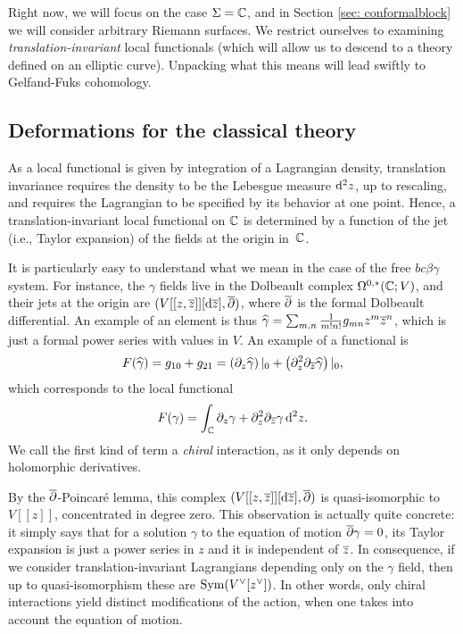 Right now, we will focus on the case $\Sigma = \mathbb C$, 
and in Section \ref{sec: conformalblock} we will consider arbitrary Riemann surfaces.
We restrict ourselves to examining {\em translation-invariant} local functionals (which will allow us to descend to a theory defined on an elliptic curve).
Unpacking what this means will lead swiftly to Gelfand-Fuks cohomology.

\subsection{Deformations for the classical theory}

As a local functional is given by integration of a Lagrangian density,
translation invariance requires the density to be the Lebesgue measure ${\rm d}^2 z$, up to rescaling,  
and requires the Lagrangian to be specified by its behavior at one point.
Hence, a translation-invariant local functional on $\mathbb C$ is determined by a function of the jet (i.e., Taylor expansion) of the fields at the origin in~$\mathbb C$. 

It is particularly easy to understand what we mean in the case of the free $bc\beta\gamma$ system.
For instance, the $\gamma$ fields live in the Dolbeault complex $\Omega^{0,*}(\mathbb C ; V)$,
and their jets at the origin are $(V [[z,\overline{z}]] [{\rm d} \overline{z}] , \overline{\partial})$,
where $\overline{\partial}$ is the formal Dolbeault differential. 
An example of an element is thus $\widehat{\gamma} = \sum_{m,n} \frac{1}{m!n!}g_{mn} z^m \overline{z}^n$,
which is just a formal power series with values in $V$.
An example of a functional is
\[
F(\widehat{\gamma}) = g_{10} + g_{21} = \left( \partial_z \widehat{\gamma}\right)|_0 + \left( \partial_z^2 \partial_{\overline{z}} \widehat{\gamma}\right)|_0,
\]
which corresponds to the local functional
\[
F(\gamma) = \int_\mathbb C \partial_z \gamma + \partial_z^2 \partial_{\overline{z}} {\gamma}\,{\rm d}^2 z.
\]
We call the first kind of term a {\em chiral} interaction, as it only depends on holomorphic derivatives.

By the $\overline{\partial}$-Poincar\'{e} lemma, 
this complex $(V [[z,\overline{z}]] [{\rm d} \overline{z}] , \overline{\partial})$ is quasi-isomorphic to $V[[z]]$, concentrated in degree zero. 
This observation is actually quite concrete:
it simply says that for a solution $\gamma$ to the equation of motion $\overline{\partial} \gamma = 0$, 
its Taylor expansion is just a power series in $z$ and it is independent of $\overline{z}$.
In consequence, if we consider translation-invariant Lagrangians depending only on the $\gamma$ field, then up to quasi-isomorphism these are ${\rm Sym}(V^\vee[z^\vee])$.
In other words, only chiral interactions yield distinct modifications of the action,
when one takes into account the equation of motion.

